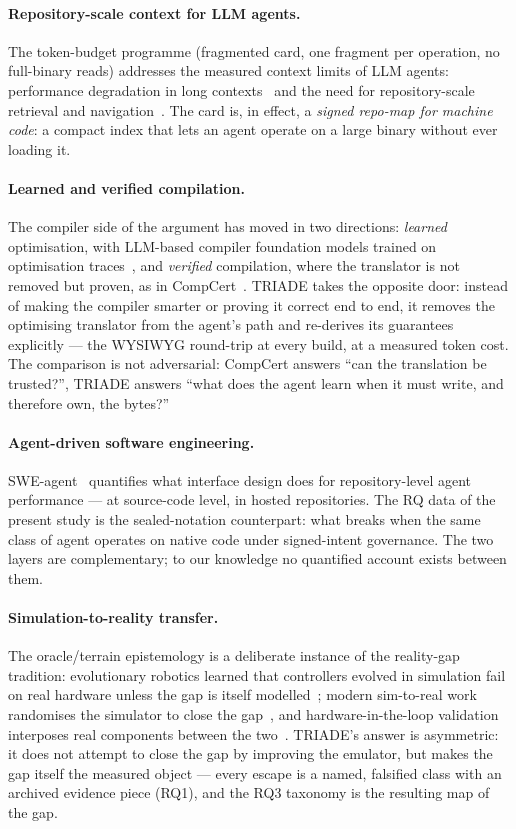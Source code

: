 \documentclass[11pt,a4paper]{article}
\begin{document}
\paragraph{Repository-scale context for LLM agents.} The token-budget
programme (fragmented card, one fragment per operation, no full-binary
reads) addresses the measured context limits of LLM agents: performance
degradation in long contexts~\cite{liu2024} and the need for
repository-scale retrieval and navigation~\cite{zhang2023, jimenez2024}.
The card is, in effect, a \emph{signed repo-map for machine code}: a
compact index that lets an agent operate on a large binary without ever
loading it.

\paragraph{Learned and verified compilation.} The compiler side of the
argument has moved in two directions: \emph{learned} optimisation, with
LLM-based compiler foundation models trained on optimisation
traces~\cite{cummins2024llmcompiler}, and \emph{verified} compilation,
where the translator is not removed but proven, as in
CompCert~\cite{leroycompcert}. TRIADE takes the opposite door: instead
of making the compiler smarter or proving it correct end to end, it
removes the optimising translator from the agent's path and re-derives
its guarantees explicitly --- the WYSIWYG round-trip at every build,
at a measured token cost. The comparison is not adversarial: CompCert
answers ``can the translation be trusted?'', TRIADE answers ``what does
the agent learn when it must write, and therefore own, the bytes?''

\paragraph{Agent-driven software engineering.} SWE-agent~\cite{yang2024sweagent}
quantifies what interface design does for repository-level agent
performance --- at source-code level, in hosted repositories. The RQ
data of the present study is the sealed-notation counterpart: what
breaks when the same class of agent operates on native code under
signed-intent governance. The two layers are complementary; to our
knowledge no quantified account exists between them.

\paragraph{Simulation-to-reality transfer.} The oracle/terrain
epistemology is a deliberate instance of the reality-gap tradition:
evolutionary robotics learned that controllers evolved in simulation
fail on real hardware unless the gap is itself modelled~\cite{jakobi1995reality};
modern sim-to-real work randomises the simulator to close the
gap~\cite{peng2018simtoreal}, and hardware-in-the-loop validation
interposes real components between the two~\cite{bacic2005hil}. TRIADE's
answer is asymmetric: it does not attempt to close the gap by improving
the emulator, but makes the gap itself the measured object --- every
escape is a named, falsified class with an archived evidence piece
(RQ1), and the RQ3 taxonomy is the resulting map of the gap.
\end{document}
